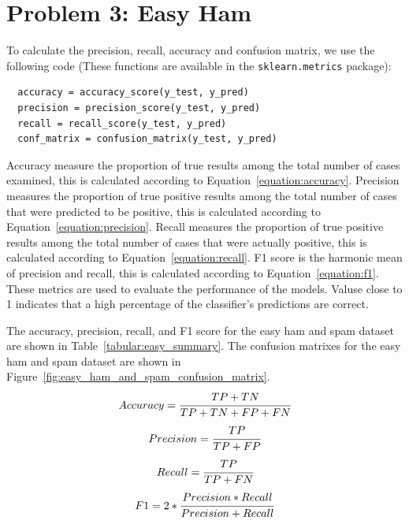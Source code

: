 \documentclass[a4paper]{article}
\begin{document}
\section*{Problem 3: Easy Ham}

To calculate the precision, recall, accuracy and confusion matrix, we use the following code (These functions are available in the \texttt{sklearn.metrics} package): 
\begin{verbatim}
  accuracy = accuracy_score(y_test, y_pred)
  precision = precision_score(y_test, y_pred)
  recall = recall_score(y_test, y_pred)
  conf_matrix = confusion_matrix(y_test, y_pred)
\end{verbatim}

Accuracy measure the proportion of true results among the total number of cases examined, this is calculated according to Equation~\ref{equation:accuracy}. 
Precision measures the proportion of true positive results among the total number of cases that were predicted to be positive, this is calculated according to Equation~\ref{equation:precision}. 
Recall measures the proportion of true positive results among the total number of cases that were actually positive, this is calculated according to Equation~\ref{equation:recall}.
F1 score is the harmonic mean of precision and recall, this is calculated according to Equation~\ref{equation:f1}.
These metrics are used to evaluate the performance of the models. 
Valuse close to 1 indicates that a high percentage of the classifier's predictions are correct. 

The accuracy, precision, recall, and F1 score for the easy ham and spam dataset are shown in Table~\ref{tabular:easy_summary}. 
The confusion matrixes for the easy ham and spam dataset are shown in Figure~\ref{fig:easy_ham_and_spam_confusion_matrix}.
\begin{equation}
  \label{equation:accuracy}
  Accuracy =  \cfrac{ TP + TN}{TP + TN + FP + FN}  
\end{equation}
\begin{equation}
  \label{equation:precision}
  Precision = \cfrac{ TP}{TP + FP}  \\
\end{equation}
\begin{equation}
  \label{equation:recall}
  Recall = \cfrac{ TP}{TP + FN}  \\
\end{equation}
\begin{equation}
  \label{equation:f1}
  F1 = 2 * \cfrac{ Precision * Recall}{Precision + Recall}
\end{equation}
\end{document}
